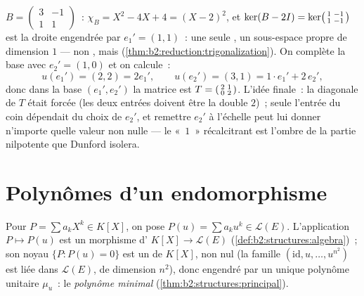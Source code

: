 \begin{example}\label{ex:b2:reduction:trigwork}
$B = \begin{pmatrix}3 & -1\\ 1 & 1\end{pmatrix}$~: $\chi_B = X^2 -
4X + 4 = (X - 2)^2$, et $\ker(B - 2I) =
\ker\begin{psmallmatrix}1 & -1\\ 1 & -1\end{psmallmatrix}$ est la
droite engendrée par $e_1' = (1, 1)$~: une seule , un
sous-espace propre de dimension $1$ --- non , mais
 (\cref{thm:b2:reduction:trigonalization}). On complète
la base avec $e_2' = (1, 0)$ et on calcule~:
\[
u(e_1') = (2, 2) = 2e_1',
\qquad
u(e_2') = (3, 1) = 1\cdot e_1' + 2\, e_2' ,
\]
donc dans la base $(e_1', e_2')$ la matrice est $T =
\begin{psmallmatrix}2 & 1\\ 0 & 2\end{psmallmatrix}$. L'idée finale~:
la diagonale de $T$ était forcée (les deux entrées doivent être la
 double $2$)~; seule l'entrée du coin dépendait du choix
de $e_2'$, et remettre $e_2'$ à l'échelle peut lui donner n'importe
quelle valeur non nulle --- le «~$1$~» récalcitrant est l'ombre de la
partie nilpotente que Dunford isolera.
\end{example}

\section{Polynômes d'un endomorphisme}

\begin{definition}\label{def:b2:reduction:polyu}
Pour $P = \sum a_k X^k \in K[X]$, on pose $P(u) = \sum a_k u^k \in
\mathcal{L}(E)$. L'application $P \mapsto P(u)$ est un morphisme
d' $K[X] \to \mathcal{L}(E)$ (\cref{def:b2:structures:algebra})~;
son noyau $\{P : P(u) = 0\}$ est un  de $K[X]$, non nul (la
famille $(\mathrm{id}, u, \dots, u^{n^2})$ est liée dans $\mathcal{L}(E)$,
de dimension $n^2$), donc engendré par un unique polynôme unitaire
$\mu_u$~: le \emph{polynôme minimal}
(\cref{thm:b2:structures:principal}).
\end{definition}

